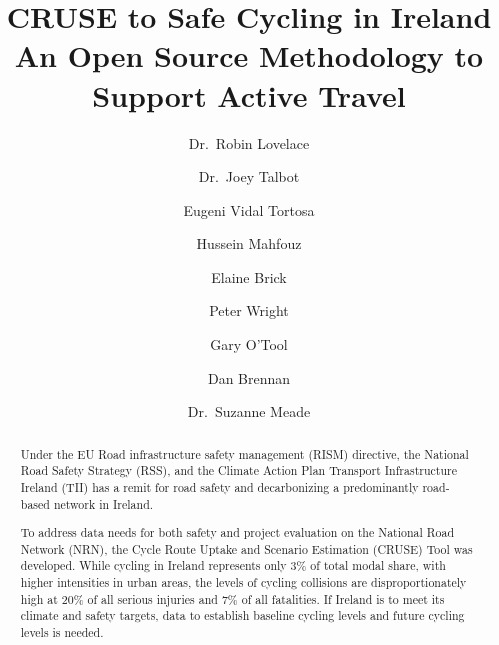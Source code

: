 \documentclass[
  super,
  preprint,
  3p]{elsarticle}
\begin{document}
\begin{frontmatter}
\title{CRUSE to Safe Cycling in Ireland \\\large{An Open Source
Methodology to Support Active Travel} }
\author[1]{Dr.~Robin Lovelace%
%
}
\author[1]{Dr.~Joey Talbot%
%
}

\author[1]{Eugeni Vidal Tortosa%
%
}

\author[1]{Hussein Mahfouz%
%
}

\author[2]{Elaine Brick%
%
}

\author[3]{Peter Wright%
%
}

\author[3]{Gary O'Tool%
%
}

\author[4]{Dan Brennan%
%
}

\author[4]{Dr.~Suzanne Meade%
%
}












        
\begin{abstract}
Under the EU Road infrastructure safety management (RISM) directive, the
National Road Safety Strategy (RSS), and the Climate Action Plan
Transport Infrastructure Ireland (TII) has a remit for road safety and
decarbonizing a predominantly road-based network in Ireland.

To address data needs for both safety and project evaluation on the
National Road Network (NRN), the Cycle Route Uptake and Scenario
Estimation (CRUSE) Tool was developed. While cycling in Ireland
represents only 3\% of total modal share, with higher intensities in
urban areas, the levels of cycling collisions are disproportionately
high at 20\% of all serious injuries and 7\% of all fatalities. If
Ireland is to meet its climate and safety targets, data to establish
baseline cycling levels and future cycling levels is needed.


\end{abstract}
\end{frontmatter}
\end{document}
